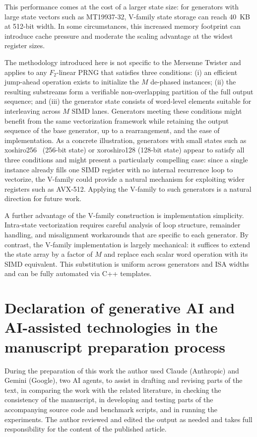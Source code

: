 \documentclass[preprint,1p,times]{elsarticle}
\begin{document}
This performance comes at the cost of a larger state size: for generators with large state vectors such as MT19937-32, V-family state storage can reach 40~KB at 512-bit width. In some circumstances, this increased memory footprint can introduce cache pressure and moderate the scaling advantage at the widest register sizes.

The methodology introduced here is not specific to the Mersenne Twister and applies to any $F_2$-linear PRNG that satisfies three conditions: (i) an efficient jump-ahead operation exists to initialize the $M$ de-phased instances; (ii) the resulting substreams form a verifiable non-overlapping partition of the full output sequence; and (iii) the generator state consists of word-level elements suitable for interleaving across $M$ SIMD lanes. Generators meeting these conditions might benefit from the same vectorization framework while retaining the output sequence of the base generator, up to a rearrangement, and the ease of implementation. As a concrete illustration, generators with small states such as xoshiro256~\cite{xoshiro} (256-bit state) or xoroshiro128 (128-bit state) appear to satisfy all three conditions and might present a particularly compelling case: since a single instance already fills one SIMD register with no internal recurrence loop to vectorize, the V-family could provide a natural mechanism for exploiting wider registers such as AVX-512. Applying the V-family to such generators is a natural direction for future work.

A further advantage of the V-family construction is implementation simplicity. Intra-state vectorization requires careful analysis of loop structure, remainder handling, and misalignment workarounds that are specific to each generator. By contrast, the V-family implementation is largely mechanical: it suffices to extend the state array by a factor of $M$ and replace each scalar word operation with its SIMD equivalent. This substitution is uniform across generators and ISA widths and can be fully automated via C++ templates.

\section*{Declaration of generative AI and AI-assisted technologies in the manuscript preparation process}
During the preparation of this work the author used Claude (Anthropic) and Gemini (Google), two AI agents, to assist in drafting and revising parts of the text, in comparing the work with the related literature, in checking the consistency of the manuscript, in developing and testing parts of the accompanying source code and benchmark scripts, and in running the experiments. The author reviewed and edited the output as needed and takes full responsibility for the content of the published article.
\end{document}
